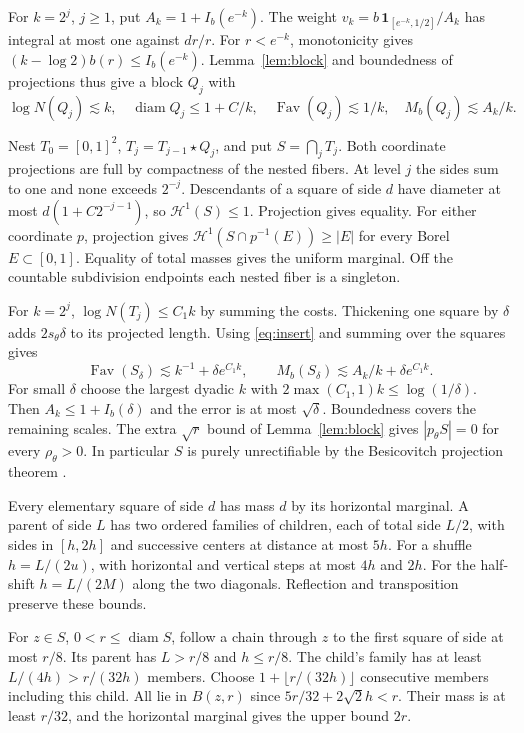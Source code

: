 \documentclass[11pt,reqno]{amsart}
\newcommand{\Fav}{\operatorname{Fav}}
\newcommand{\diam}{\operatorname{diam}}
\begin{document}
For $k=2^j$, $j\ge1$, put $A_k=1+I_b(e^{-k})$. The weight $v_k=b\,\mathbf1_{[e^{-k},1/2]}/A_k$ has integral at most one against $dr/r$. For $r<e^{-k}$, monotonicity gives $(k-\log2)b(r)\le I_b(e^{-k})$. Lemma~\ref{lem:block} and boundedness of projections thus give a block $Q_j$ with
\[
 \log N(Q_j)\lesssim k,\quad \diam Q_j\le1+C/k,\quad
 \Fav(Q_j)\lesssim1/k,\quad M_b(Q_j)\lesssim A_k/k .
\]

Nest $T_0=[0,1]^2$, $T_j=T_{j-1}\star Q_j$, and put $S=\bigcap_j T_j$. Both coordinate projections are full by compactness of the nested fibers. At level $j$ the sides sum to one and none exceeds $2^{-j}$. Descendants of a square of side $d$ have diameter at most $d(1+C2^{-j-1})$, so $\mathcal H^1(S)\le1$. Projection gives equality. For either coordinate $p$, projection gives $\mathcal H^1(S\cap p^{-1}(E))\ge|E|$ for every Borel $E\subset[0,1]$. Equality of total masses gives the uniform marginal. Off the countable subdivision endpoints each nested fiber is a singleton.

For $k=2^j$, $\log N(T_j)\le C_1k$ by summing the costs. Thickening one square by $\delta$ adds $2s_\theta\delta$ to its projected length. Using \eqref{eq:insert} and summing over the squares gives
\[
 \Fav(S_\delta)\lesssim k^{-1}+\delta e^{C_1k},\qquad
 M_b(S_\delta)\lesssim A_k/k+\delta e^{C_1k}.
\]
For small $\delta$ choose the largest dyadic $k$ with $2\max(C_1,1)k\le\log(1/\delta)$. Then $A_k\le1+I_b(\delta)$ and the error is at most $\sqrt\delta$. Boundedness covers the remaining scales. The extra $\sqrt r$ bound of Lemma~\ref{lem:block} gives $|p_\theta S|=0$ for every $\rho_\theta>0$. In particular $S$ is purely unrectifiable by the Besicovitch projection theorem \cite[\S1.1]{CSS}.

Every elementary square of side $d$ has mass $d$ by its horizontal marginal. A parent of side $L$ has two ordered families of children, each of total side $L/2$, with sides in $[h,2h]$ and successive centers at distance at most $5h$. For a shuffle $h=L/(2u)$, with horizontal and vertical steps at most $4h$ and $2h$. For the half-shift $h=L/(2M)$ along the two diagonals. Reflection and transposition preserve these bounds.

For $z\in S$, $0<r\le\diam S$, follow a chain through $z$ to the first square of side at most $r/8$. Its parent has $L>r/8$ and $h\le r/8$. The child's family has at least $L/(4h)>r/(32h)$ members. Choose $1+\lfloor r/(32h)\rfloor$ consecutive members including this child. All lie in $B(z,r)$ since $5r/32+2\sqrt2h<r$. Their mass is at least $r/32$, and the horizontal marginal gives the upper bound $2r$.
\end{document}
